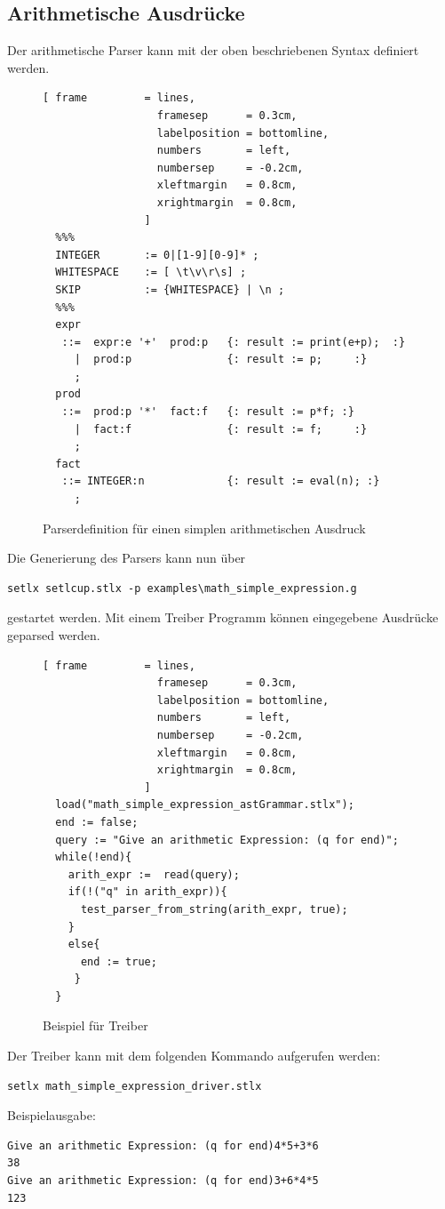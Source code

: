 \subsection{Arithmetische Ausdrücke}
Der arithmetische Parser  kann mit der oben beschriebenen Syntax definiert werden.
\begin{figure}[!ht]
\begin{Verbatim}[ frame         = lines, 
                  framesep      = 0.3cm, 
                  labelposition = bottomline,
                  numbers       = left,
                  numbersep     = -0.2cm,
                  xleftmargin   = 0.8cm,
                  xrightmargin  = 0.8cm,
                ]
  %%%
  INTEGER       := 0|[1-9][0-9]* ;
  WHITESPACE    := [ \t\v\r\s] ;
  SKIP          := {WHITESPACE} | \n ;
  %%%
  expr 
   ::=  expr:e '+'  prod:p   {: result := print(e+p);  :} 
     |  prod:p               {: result := p;     :}
     ;
  prod 
   ::=  prod:p '*'  fact:f   {: result := p*f; :}
     |  fact:f               {: result := f;     :}
     ;
  fact 
   ::= INTEGER:n             {: result := eval(n); :} 
     ;
\end{Verbatim}
\caption{Parserdefinition für einen simplen arithmetischen Ausdruck}
\label{fig:example_arithmetic_grammer}
\end{figure}
%
Die Generierung des Parsers kann nun über
\begin{Verbatim}
setlx setlcup.stlx -p examples\math_simple_expression.g
\end{Verbatim}
gestartet werden.
Mit einem Treiber Programm können eingegebene Ausdrücke geparsed werden.
\begin{figure}[!htb]
\begin{Verbatim}[ frame         = lines, 
                  framesep      = 0.3cm, 
                  labelposition = bottomline,
                  numbers       = left,
                  numbersep     = -0.2cm,
                  xleftmargin   = 0.8cm,
                  xrightmargin  = 0.8cm,
                ]
  load("math_simple_expression_astGrammar.stlx");
  end := false;
  query := "Give an arithmetic Expression: (q for end)";
  while(!end){
    arith_expr :=  read(query);
    if(!("q" in arith_expr)){
      test_parser_from_string(arith_expr, true);
    }
    else{
      end := true;
     }
  }
\end{Verbatim}
\caption{Beispiel für Treiber}
\label{fig:simple_arith_driver}
\end{figure}
Der Treiber kann mit dem folgenden Kommando aufgerufen werden:
\begin{Verbatim}
setlx math_simple_expression_driver.stlx
\end{Verbatim}
Beispielausgabe:
\begin{Verbatim}
Give an arithmetic Expression: (q for end)4*5+3*6
38
Give an arithmetic Expression: (q for end)3+6*4*5
123
\end{Verbatim}
